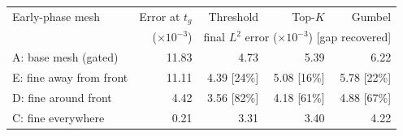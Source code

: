 \begin{tabular}{lrrrr}
\toprule
Early-phase mesh & Error at $t_g$ & Threshold & Top-$K$ & Gumbel \\
 & ($\times10^{-3}$) & \multicolumn{3}{c}{final $L^2$ error ($\times10^{-3}$) [gap recovered]} \\
\midrule
A: base mesh (gated) & 11.83 & 4.73 & 5.39 & 6.22 \\
E: fine away from front & 11.11 & 4.39 [24\%] & 5.08 [16\%] & 5.78 [22\%] \\
D: fine around front & 4.42 & 3.56 [82\%] & 4.18 [61\%] & 4.88 [67\%] \\
C: fine everywhere & 0.21 & 3.31 & 3.40 & 4.22 \\
\bottomrule
\end{tabular}
